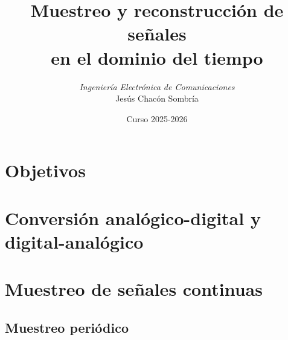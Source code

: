 \documentclass[handout]{beamer}
\title[Procesamiento de Señales]{Muestreo y reconstrucción de señales \\ en el dominio del tiempo}
\author[Jesús Chacón] {%
	\textit{Ingeniería Electrónica de Comunicaciones}\\
	\vspace{0.6cm}
	\small Jesús Chacón Sombría%
}%
\institute[DACYA] {%
	\footnotesize  Departamento de Arquitectura de Computadores y Automática\\
  Universidad Complutense de Madrid
}
\date[Muestreo y reconstrucción] %
{\footnotesize Curso 2025-2026}%
\newcommand{\MyLogo}{%
\begin{textblock}{14}(116.0,0.6)
  \pgfuseimage{logo}
\end{textblock}
}
\numberwithin{section}{part}
\begin{document}
\begin{frame}
  \titlepage
\end{frame}

\newcommand*\oldmacro{}%
\let\oldmacro\insertshorttitle%
\renewcommand*\insertshorttitle{%
 \MyLogo
  \oldmacro\hfill%
}

\AtBeginSection[]{}
\AtBeginSubsection[]{}

\section{Objetivos}

\section{Conversión analógico-digital y digital-analógico}

\section{Muestreo de señales continuas}
\subsection{Muestreo periódico}

\end{document}
